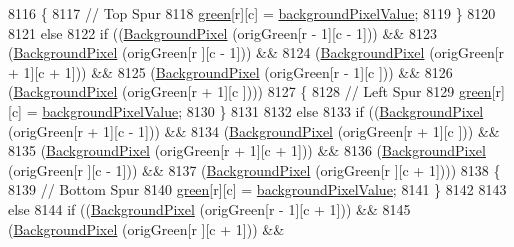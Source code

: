 \begin{DoxyCode}
8116         \{
8117           \textcolor{comment}{// Top Spur}
8118           \hyperlink{class_k_k_b_1_1_raster_a2d2238911145488e226cd2e34fc8448c}{green}[r][c] = \hyperlink{class_k_k_b_1_1_raster_ab7ed2191cce116a6a37029dc6e3713ef}{backgroundPixelValue};
8119         \}
8120 
8121         \textcolor{keywordflow}{else}
8122         \textcolor{keywordflow}{if}  ((\hyperlink{class_k_k_b_1_1_raster_a0756fb5530274d5e28858d3e1633d595}{BackgroundPixel} (origGreen[r - 1][c - 1]))  &&
8123              (\hyperlink{class_k_k_b_1_1_raster_a0756fb5530274d5e28858d3e1633d595}{BackgroundPixel} (origGreen[r    ][c - 1]))  &&
8124              (\hyperlink{class_k_k_b_1_1_raster_a0756fb5530274d5e28858d3e1633d595}{BackgroundPixel} (origGreen[r + 1][c + 1]))  &&
8125              (\hyperlink{class_k_k_b_1_1_raster_a0756fb5530274d5e28858d3e1633d595}{BackgroundPixel} (origGreen[r - 1][c    ]))  &&
8126              (\hyperlink{class_k_k_b_1_1_raster_a0756fb5530274d5e28858d3e1633d595}{BackgroundPixel} (origGreen[r + 1][c    ])))
8127         \{
8128           \textcolor{comment}{// Left Spur}
8129           \hyperlink{class_k_k_b_1_1_raster_a2d2238911145488e226cd2e34fc8448c}{green}[r][c] = \hyperlink{class_k_k_b_1_1_raster_ab7ed2191cce116a6a37029dc6e3713ef}{backgroundPixelValue};
8130         \}
8131 
8132         \textcolor{keywordflow}{else}
8133         \textcolor{keywordflow}{if}  ((\hyperlink{class_k_k_b_1_1_raster_a0756fb5530274d5e28858d3e1633d595}{BackgroundPixel} (origGreen[r + 1][c - 1]))  &&
8134              (\hyperlink{class_k_k_b_1_1_raster_a0756fb5530274d5e28858d3e1633d595}{BackgroundPixel} (origGreen[r + 1][c    ]))  &&
8135              (\hyperlink{class_k_k_b_1_1_raster_a0756fb5530274d5e28858d3e1633d595}{BackgroundPixel} (origGreen[r + 1][c + 1]))  &&
8136              (\hyperlink{class_k_k_b_1_1_raster_a0756fb5530274d5e28858d3e1633d595}{BackgroundPixel} (origGreen[r    ][c - 1]))  &&
8137              (\hyperlink{class_k_k_b_1_1_raster_a0756fb5530274d5e28858d3e1633d595}{BackgroundPixel} (origGreen[r    ][c + 1])))
8138         \{
8139           \textcolor{comment}{// Bottom Spur}
8140           \hyperlink{class_k_k_b_1_1_raster_a2d2238911145488e226cd2e34fc8448c}{green}[r][c] = \hyperlink{class_k_k_b_1_1_raster_ab7ed2191cce116a6a37029dc6e3713ef}{backgroundPixelValue};
8141         \}
8142 
8143         \textcolor{keywordflow}{else}
8144         \textcolor{keywordflow}{if}  ((\hyperlink{class_k_k_b_1_1_raster_a0756fb5530274d5e28858d3e1633d595}{BackgroundPixel} (origGreen[r - 1][c + 1]))  &&
8145              (\hyperlink{class_k_k_b_1_1_raster_a0756fb5530274d5e28858d3e1633d595}{BackgroundPixel} (origGreen[r    ][c + 1]))  &&

\end{DoxyCode}
